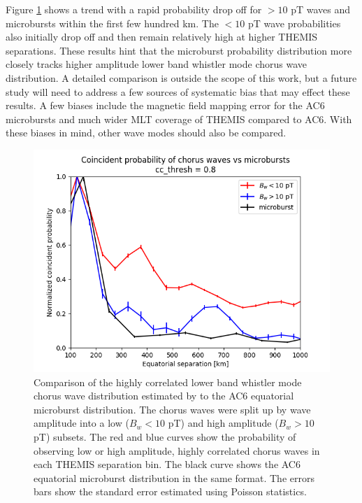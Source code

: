 \documentclass[draft]{agujournal2019}
\begin{document}
Figure \ref{fig_appendixc_1} shows a trend with a rapid probability drop off for $> 10$ pT waves and microbursts within the first few hundred km. The $< 10$ pT wave probabilities also initially drop off and then remain relatively high at higher THEMIS separations. These results hint that the microburst probability distribution more closely tracks higher amplitude lower band whistler mode chorus wave distribution. A detailed comparison is outside the scope of this work, but a future study will need to address a few sources of systematic bias that may effect these results. A few biases include the magnetic field mapping error for the AC6 microbursts and much wider MLT coverage of THEMIS compared to AC6. With these biases in mind, other wave modes should also be compared.

\begin{figure}
\includegraphics[width=\textwidth]{appendixc_compare_chorus_microburst_fraction_cc_thresh_8.png}
\caption{Comparison of the highly correlated lower band whistler mode chorus wave distribution estimated by  to the AC6 equatorial microburst distribution. The chorus waves were split up by wave amplitude into a low ($B_w < 10$ pT) and high amplitude ($B_w > 10$ pT) subsets. The red and blue curves show the probability of observing low or high amplitude, highly correlated chorus waves in each THEMIS separation bin. The black curve shows the AC6 equatorial microburst distribution in the same format. The errors bars show the standard error estimated using Poisson statistics.}
\label{fig_appendixc_1}
\end{figure}
\end{document}
